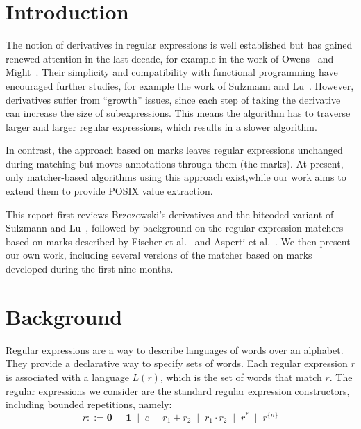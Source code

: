 \documentclass[12pt]{article}
\newcommand{\ZERO}{\textbf{0}}
\newcommand{\ONE}{\textbf{1}}
\begin{document}
\newpage

\tableofcontents

\newpage

\section{Introduction}

The notion of derivatives in regular expressions is well established but has gained renewed 
attention in the last decade, for example in the work of Owens~\cite{Owens2009} and 
Might~\cite{Might2011}. Their simplicity and compatibility with functional programming have 
encouraged further studies, for example the work of Sulzmann and Lu~\cite{Sulzmann2014}.  
However, derivatives suffer from “growth” issues, since each step of taking the derivative 
can increase the size of subexpressions. This means the algorithm has to traverse larger and 
larger regular expressions, which results in a slower algorithm.  

In contrast, the approach based on marks leaves regular expressions unchanged during matching
 but moves annotations through them (the marks). At present, only matcher-based algorithms 
 using this approach exist,while our work aims to extend them to provide POSIX value extraction. 

This report first reviews Brzozowski's derivatives and the bitcoded variant of 
Sulzmann and Lu~\cite{Sulzmann2014}, followed by background on the regular 
expression matchers based on marks described by Fischer et al.~\cite{Fischer2010} 
and Asperti et al.~\cite{Asperti2010}.  
We then present our own work, including several versions of the matcher based 
on marks developed during the first nine months.

\section{Background}

Regular expressions are a way to describe languages of words over an alphabet.
They provide a declarative way to specify sets of words. Each regular
expression $r$ is associated with a language $L(r)$, which is the set of words
that match $r$. The regular expressions we consider are the standard regular 
expression constructors, including bounded repetitions, namely:
\[
r ::= \ZERO \;\mid\; \ONE \;\mid\; c \;\mid\; r_1 + r_2 \;\mid\; r_1 \cdot r_2 \;\mid\; 
r^* \;\mid\; r^{\{n\}}
\]
\end{document}
